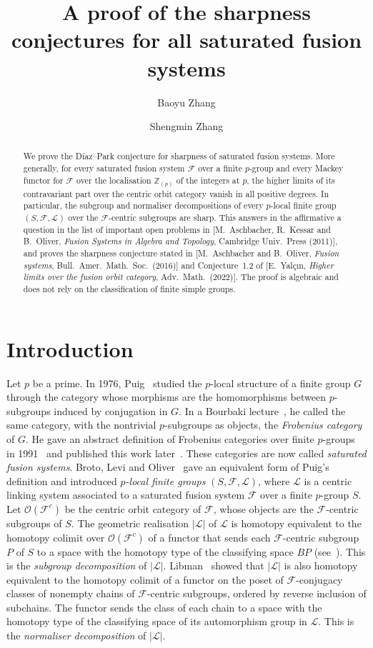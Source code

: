 \documentclass[10pt]{amsart}
\title{A proof of the sharpness conjectures for all saturated fusion systems}
\author{Baoyu Zhang}
\author{Shengmin Zhang}
\date{}
\theoremstyle{definition}
\numberwithin{equation}{section}
\newcommand{\F}{\mathcal F}
\newcommand{\Op}{\mathcal O}
\begin{document}
\begin{abstract}
We prove the D\'iaz--Park conjecture for sharpness of saturated fusion systems. More generally, for every saturated fusion system $\F$ over a finite $p$-group and every Mackey functor for $\F$ over the localisation $\mathbb{Z}_{(p)}$ of the integers at $p$, the higher limits of its contravariant part over the centric orbit category vanish in all positive degrees. In particular, the subgroup and normaliser decompositions of every $p$-local finite group $(S,\F,\mathcal L)$ over the $\F$-centric subgroups are sharp. This answers in the affirmative a question in the list of important open problems in [M.~Aschbacher, R.~Kessar and B.~Oliver, \emph{Fusion Systems in Algebra and Topology}, Cambridge Univ.\ Press (2011)], and proves the sharpness conjecture stated in [M.~Aschbacher and B.~Oliver, \emph{Fusion systems}, Bull.\ Amer.\ Math.\ Soc.\ (2016)] and Conjecture~1.2 of [E.~Yal\c{c}\i{}n, \emph{Higher limits over the fusion orbit category}, Adv.\ Math.\ (2022)]. The proof is algebraic and does not rely on the classification of finite simple groups.
\end{abstract}
\maketitle
\section{Introduction}
Let $p$ be a prime. In 1976, Puig~\cite{Puig1976} studied the $p$-local structure of a finite group $G$ through the category whose morphisms are the homomorphisms between $p$-subgroups induced by conjugation in $G$. In a Bourbaki lecture~\cite{Puig1982}, he called the same category, with the nontrivial $p$-subgroups as objects, the \emph{Frobenius category} of $G$. He gave an abstract definition of Frobenius categories over finite $p$-groups in 1991~\cite[\S1.3]{Puig2006} and published this work later~\cite{Puig2006,Puig2009}. These categories are now called \emph{saturated fusion systems}. Broto, Levi and Oliver~\cite{BLO} gave an equivalent form of Puig's definition and introduced \emph{$p$-local finite groups} $(S,\F,\mathcal L)$, where $\mathcal L$ is a centric linking system associated to a saturated fusion system $\F$ over a finite $p$-group $S$. Let $\Op(\F^c)$ be the centric orbit category of $\F$, whose objects are the $\F$-centric subgroups of $S$. The geometric realisation $|\mathcal L|$ of $\mathcal L$ is homotopy equivalent to the homotopy colimit over $\Op(\F^c)$ of a functor that sends each $\F$-centric subgroup $P$ of $S$ to a space with the homotopy type of the classifying space $BP$ (see~\cite[Proposition~2.2]{BLO}). This is the \emph{subgroup decomposition} of $|\mathcal L|$. Libman~\cite{Libman2006} showed that $|\mathcal L|$ is also homotopy equivalent to the homotopy colimit of a functor on the poset of $\F$-conjugacy classes of nonempty chains of $\F$-centric subgroups, ordered by reverse inclusion of subchains. The functor sends the class of each chain to a space with the homotopy type of the classifying space of its automorphism group in $\mathcal L$. This is the \emph{normaliser decomposition} of $|\mathcal L|$.
\end{document}

